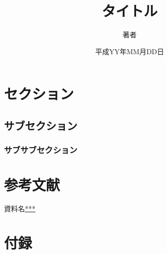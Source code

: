 \documentclass{jsarticle}
\begin{document}
\title{タイトル}
\author{著者}
\date{平成YY年MM月DD日}
\maketitle
\section{セクション}
\subsection{サブセクション}
\subsubsection{サブサブセクション}
\section{参考文献}
\begin{thebibliography}{99}
資料名\url{***}
\end{thebibliography}
\section{付録}

\end{document}

